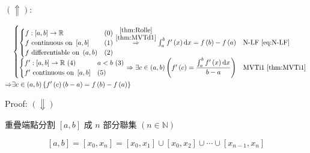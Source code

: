 \documentclass[
]{book}
\theoremstyle{definition}
\theoremstyle{definition}
\theoremstyle{definition}
\theoremstyle{definition}
\theoremstyle{remark}
\begin{document}
\(\left(\Uparrow\right)\):

\[
\begin{aligned}
 & \begin{cases}
\begin{cases}
f:\left[a,b\right]\rightarrow\mathbb{R} & \left(0\right)\\
f\text{ continuous on }\left[a,b\right] & \left(1\right)\\
f\text{ differentiable on }\left(a,b\right) & \left(2\right)
\end{cases}\overset{\stackrel{\ref{thm:Rolle}}{\ref{thm:MVTd1}}}{\Rightarrow}\int_{a}^{b}f^{\prime}\left(x\right)\mathrm{d}x=f\left(b\right)-f\left(a\right) & \text{N-LF }\ref{eq:N-LF}\\
\begin{cases}
f^{\prime}:\left[a,b\right]\rightarrow\mathbb{R}\,\left(4\right) & a<b\,\left(3\right)\\
f^{\prime}\text{ continuous on }\left[a,b\right] & \left(5\right)
\end{cases}\Rightarrow\exists c\in\left(a,b\right)\left(f^{\prime}\left(c\right)=\dfrac{\int_{a}^{b}f^{\prime}\left(x\right)\mathrm{d}x}{b-a}\right) & \text{MVTi1 }\ref{thm:MVTi1}
\end{cases}\nonumber \\
\Rightarrow & \exists c\in\left(a,b\right)\left\{ f^{\prime}\left(c\right)\left(b-a\right)=f\left(b\right)-f\left(a\right)\right\} \label{eq:MVTd1fromN-LFandMVTi1}
\end{aligned}
\]

Proof: \(\left(\Downarrow\right)\)

\begin{CJK}{UTF8}{bsmi}
重疊端點分割 $\left[a,b\right]$ 成 $n$ 部分聯集 $\left(n\in\mathbb{N}\right)$
\end{CJK}

\begin{equation}
\left[a,b\right]=\left[x_{0},x_{n}\right]=\left[x_{0},x_{1}\right]\cup\left[x_{0},x_{2}\right]\cup\cdots\cup\left[x_{n-1},x_{n}\right]\label{eq:-72}
\end{equation}
\end{document}
